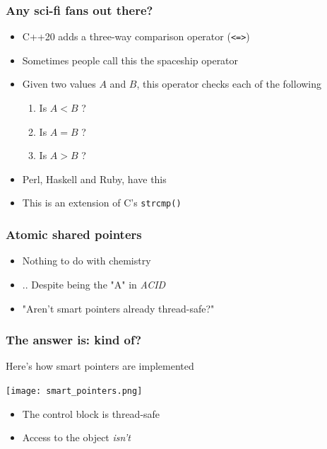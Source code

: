 \documentclass{beamer}
\begin{document}
\begin{frame}
\frametitle{Any sci-fi fans out there?}
\begin{itemize}
\setlength\itemsep{2em}
\item C++20 adds a three-way comparison operator (\texttt{<=>})
\item Sometimes people call this the spaceship operator
\item Given two values $A$ and $B$, this operator checks each of the following
\begin{enumerate}
\item Is $A < B$ ?
\item Is $A = B$ ?
\item Is $A > B$ ?
\end{enumerate}

\item Perl, Haskell and Ruby, have this

\item This is an extension of C's \texttt{strcmp()}
\end{itemize}
\end{frame}

\begin{frame}
\frametitle{Atomic shared pointers}

\begin{itemize}
\setlength\itemsep{2em}
\item Nothing to do with chemistry

\item .. Despite being the "A" in \textit{ACID}
\item "Aren't smart pointers already thread-safe?"

\end{itemize}
\end{frame}


\begin{frame}
\frametitle{The answer is: kind of?}
Here's how smart pointers are implemented

\vspace{1em}
\begin{center}
\texttt{[image: smart\_pointers.png]}
\end{center}
\begin{itemize}
\item The control block is thread-safe 
\item Access to the object \emph{isn't}
\end{itemize}
\end{frame}
\end{document}
